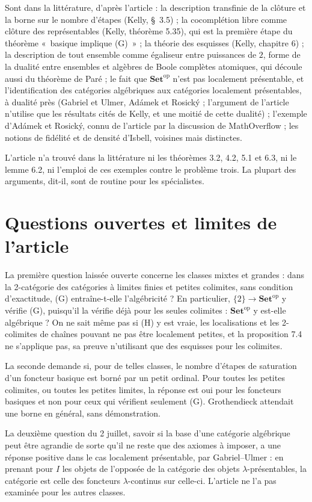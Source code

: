 \documentclass[11pt,a4paper]{amsart}
\theoremstyle{definition}
\theoremstyle{plain}
\theoremstyle{remark}
\newcommand{\Set}{\mathbf{Set}}
\begin{document}
Sont dans la littérature, d'après l'article : la description transfinie de la clôture et la borne sur le nombre d'étapes (Kelly, §~3.5) ; la cocomplétion libre comme clôture des représentables (Kelly, théorème 5.35), qui est la première étape du théorème «~basique implique (G)~» ; la théorie des esquisses (Kelly, chapitre 6) ; la description de tout ensemble comme égaliseur entre puissances de $2$, forme de la dualité entre ensembles et algèbres de Boole complètes atomiques, qui découle aussi du théorème de Paré ; le fait que $\Set^{\mathrm{op}}$ n'est pas localement présentable, et l'identification des catégories algébriques aux catégories localement présentables, à dualité près (Gabriel et Ulmer, Adámek et Rosický ; l'argument de l'article n'utilise que les résultats cités de Kelly, et une moitié de cette dualité) ; l'exemple d'Adámek et Rosický, connu de l'article par la discussion de MathOverflow ; les notions de fidélité et de densité d'Isbell, voisines mais distinctes.

L'article n'a trouvé dans la littérature ni les théorèmes 3.2, 4.2, 5.1 et 6.3, ni le lemme 6.2, ni l'emploi de ces exemples contre le problème trois. La plupart des arguments, dit-il, sont de routine pour les spécialistes.

\section{Questions ouvertes et limites de l'article}

La première question laissée ouverte concerne les classes mixtes et grandes : dans la 2-catégorie des catégories à limites finies et petites colimites, sans condition d'exactitude, (G) entraîne-t-elle l'algébricité ? En particulier, $\{2\}\to\Set^{\mathrm{op}}$ y vérifie (G), puisqu'il la vérifie déjà pour les seules colimites : $\Set^{\mathrm{op}}$ y est-elle algébrique ? On ne sait même pas si (H) y est vraie, les localisations et les 2-colimites de chaînes pouvant ne pas être localement petites, et la proposition 7.4 ne s'applique pas, sa preuve n'utilisant que des esquisses pour les colimites.

La seconde demande si, pour de telles classes, le nombre d'étapes de saturation d'un foncteur basique est borné par un petit ordinal. Pour toutes les petites colimites, ou toutes les petites limites, la réponse est oui pour les foncteurs basiques et non pour ceux qui vérifient seulement (G). Grothendieck attendait une borne en général, sans démonstration.

La deuxième question du 2 juillet, savoir si la base d'une catégorie algébrique peut être agrandie de sorte qu'il ne reste que des axiomes à imposer, a une réponse positive dans le cas localement présentable, par Gabriel--Ulmer : en prenant pour $I$ les objets de l'opposée de la catégorie des objets $\lambda$-présentables, la catégorie est celle des foncteurs $\lambda$-continus sur celle-ci. L'article ne l'a pas examinée pour les autres classes.
\end{document}
